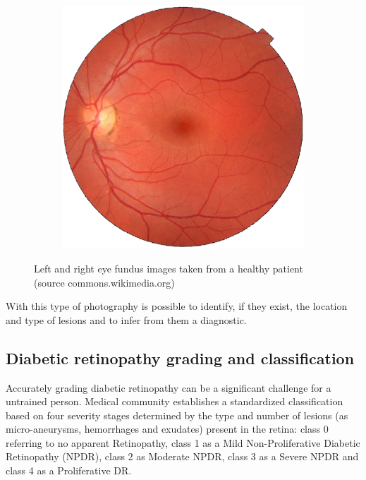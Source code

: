 \begin{figure}[ht!]
{\begin{subfigure}[b]{.4\textwidth}
			\includegraphics[width=\textwidth]{Figures/chapter_introduction/fundus_normal_eye_left.eps}\\
		\end{subfigure}
	}
	\hfill 
	\caption[Eye fundus images taken from a healthy patient]{Left and right eye fundus images taken from a healthy patient (source commons.wikimedia.org)}  
	\label{back:fig:fundus_image_left_right_normal} 
\end{figure}

With this type of photography is possible to identify, if they exist, the location and type of lesions and to infer from them a diagnostic.

\subsection{Diabetic retinopathy grading and classification}

Accurately grading diabetic retinopathy can be a significant challenge for a untrained person. Medical community establishes a standardized classification based on four severity stages \citep{diaclass} determined by the type and number of lesions (as micro-aneurysms, hemorrhages and exudates) present in the retina: class 0 referring to no apparent Retinopathy, class 1 as a Mild Non-Proliferative Diabetic Retinopathy (NPDR), class 2 as Moderate NPDR, class 3 as a Severe NPDR and class 4 as a Proliferative DR. 

